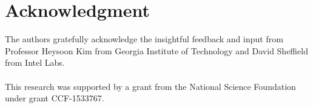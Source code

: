 \section{Acknowledgment}

The authors gratefully acknowledge the insightful feedback and input from Professor Heysoon Kim from Georgia Institute of Technology and David Sheffield from Intel Labs.\\
\\
This research was supported by a grant from the National Science Foundation under grant CCF-1533767.